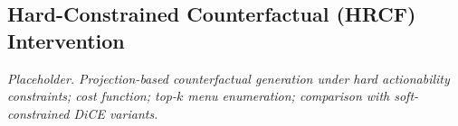 \documentclass[11pt,a4paper]{article}
\begin{document}
\subsection{Hard-Constrained Counterfactual (HRCF) Intervention}
\label{sec:methods-hrcf}
\textit{Placeholder. Projection-based counterfactual generation under
hard actionability constraints; cost function; top-$k$ menu
enumeration; comparison with soft-constrained DiCE variants.}
\end{document}
